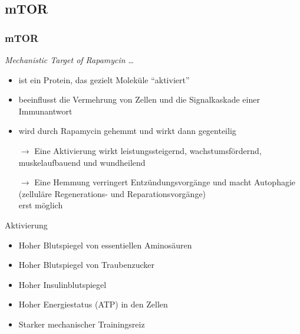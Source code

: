 \documentclass[xcolor=dvipsnames]{beamer}
\begin{document}
    \subsection{mTOR}
    \begin{frame}[allowframebreaks]
        \frametitle{mTOR}

        \begin{block}{\textit{Mechanistic Target of Rapamycin} \ldots}
            \begin{itemize}
                \setlength\itemsep{1em}
                \item ist ein Protein, das gezielt Moleküle "`aktiviert"'
                \item beeinflusst die Vermehrung von Zellen und die Signalkaskade einer Immunantwort
                \item wird durch Rapamycin gehemmt und wirkt dann gegenteilig
                \item[$\rightarrow$] Eine Aktivierung wirkt leistungssteigernd, wachstumsfördernd, muskelaufbauend und wundheilend
                \item[$\rightarrow$] Eine Hemmung verringert Entzündungsvorgänge und macht Autophagie (zelluläre Regenerations- und Reparationsvorgänge)\\ erst möglich
            \end{itemize}
        \end{block}

        \framebreak

        \begin{block}{Aktivierung}
            \begin{itemize}
                \setlength\itemsep{1em}
                \item Hoher Blutspiegel von essentiellen Aminosäuren
                \item Hoher Blutspiegel von Traubenzucker
                \item Hoher Insulinblutspiegel
                \item Hoher Energiestatus (ATP) in den Zellen
                \item Starker mechanischer Trainingsreiz
            \end{itemize}
        \end{block}

        \framebreak


\end{frame}
\end{document}
